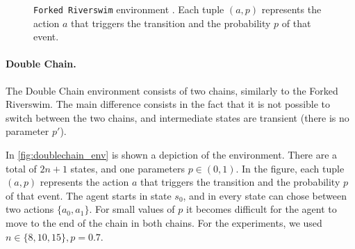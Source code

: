 \begin{figure}[h]
{}
    \caption{{\tt Forked Riverswim} environment \cite{russo2023model}. Each tuple $(a,p)$ represents the action $a$ that triggers the transition and the probability $p$ of that event.}
    \label{fig:forkedriverswim_env}
\end{figure}


\paragraph{Double Chain.} The Double Chain environment \cite{Kaufmann21a} consists of two chains, similarly to the Forked Riverswim. The main difference consists in the fact that it is not possible to switch between the two chains, and intermediate states are transient (there is no parameter $p'$).


In \cref{fig:doublechain_env} is shown a depiction of the environment. There are a total of $2n+1$ states, and one parameters $p\in (0,1)$. In the figure, each tuple $(a,p)$ represents the  action $a$ that triggers the transition and the probability $p$ of that event. The agent starts in state $s_0$, and in every state can chose between two actions $\{a_0,a_1\}$. For small values of $p$ it becomes difficult for the agent to move to the end of the chain  in both chains. For the experiments, we used $n\in \{8,10,15\}, p=0.7$.



